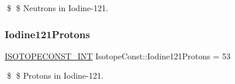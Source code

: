 \$ \$ Neutrons in Iodine-\/121. \mbox{\label{group___isotope_const-_iodine-_i121_gaf51f44bb44ac489b409682deaeb7bb1a}} 
\subsubsection{\texorpdfstring{Iodine121\+Protons}{Iodine121Protons}}
{\footnotesize\ttfamily \mbox{\hyperlink{group___isotope_const-_macros_ga5f18360b3e99483a35c32d789e62621c}{I\+S\+O\+T\+O\+P\+E\+C\+O\+N\+S\+T\+\_\+\+I\+NT}} Isotope\+Const\+::\+Iodine121\+Protons = 53}

\$ \$ Protons in Iodine-\/121. 